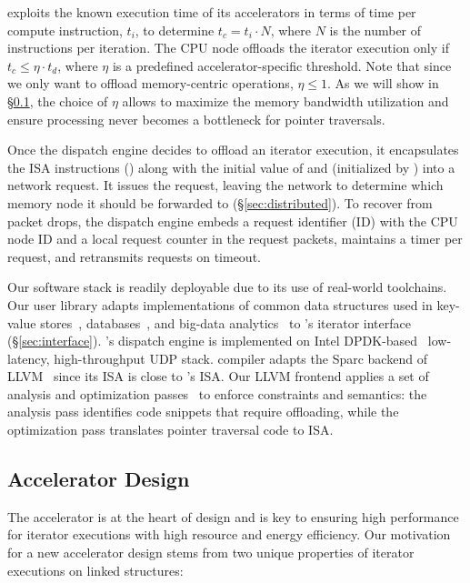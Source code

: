 \pulse exploits the known execution time of its accelerators in terms of time per compute instruction, $t_i$, to determine $t_c = t_i \cdot N$, where $N$ is the number of instructions per iteration. The CPU node offloads the iterator execution only if $t_c \leq \eta \cdot t_d$, where $\eta$ is a predefined accelerator-specific threshold. Note that since we only want to offload memory-centric operations, $\eta \leq 1$. As we will show in \S\ref{ssec:architecture}, the choice of $\eta$ allows \pulse to maximize the memory bandwidth utilization and ensure processing never becomes a bottleneck for pointer traversals.


 Once the dispatch engine decides to offload an iterator execution, it encapsulates the ISA instructions () along with the initial value of  and  (initialized by ) into a network request. It issues the request, leaving the network to determine which memory node it should be forwarded to (\S\ref{sec:distributed}). To recover from packet drops, the dispatch engine embeds a request identifier (ID) with the CPU node ID and a local request counter in the request packets, maintains a timer per request, and retransmits requests on timeout.

 Our software stack is readily deployable due to its use of real-world toolchains. Our user library adapts implementations of common data structures used in key-value stores~\cite{redis, memcached}, databases~\cite{wiredtiger, btree1, btree2, trie1, trie3}, and big-data analytics~\cite{powergraph, graphx, graphchi, pagerank} to \pulse's iterator interface (\S\ref{sec:interface}). \pulse's dispatch engine is implemented on Intel DPDK-based~\cite{dpdk} low-latency, high-throughput UDP stack. \pulse compiler adapts the Sparc backend of LLVM~\cite{llvmsparc} since its ISA is close to \pulse's ISA. Our LLVM frontend applies a set of analysis and optimization passes~\cite{llvmpass} to enforce \pulse constraints and semantics: the analysis pass identifies code snippets that require offloading, while the optimization pass translates pointer traversal code to \pulse ISA.


\subsection{\pulse Accelerator Design}
\label{ssec:architecture}
\label{ssec:traversalexample}
The accelerator is at the heart of \pulse design and is key to ensuring high performance for iterator executions with high resource and energy efficiency. Our motivation for a new accelerator design stems from two unique properties of iterator executions on linked structures: 




